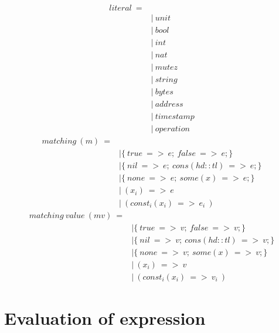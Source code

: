 \documentclass[10pt,a4paper]{article}
\begin{document}
\begin{align*}
literal\ =
\\
 \ &|\ unit     \tag{}
\\
 \ &|\ bool     \tag{}
\\
 \ &|\ int     \tag{}
\\
 \ &|\ nat     \tag{}
\\
 \ &|\ mutez     \tag{}
\\
 \ &|\ string     \tag{}
\\
 \ &|\ bytes     \tag{}
\\
 \ &|\ address     \tag{}
\\
 \ &|\ timestamp     \tag{}
\\
 \ &|\ operation     \tag{}
\end{align*}
\begin{align*}
matching\ (m)\ = 
\\
 \ &| \{\ true\ =>\ e;\ false\ =>\ e;\}        \tag{match\ bool}
\\
 \ &| \{\ nil \ =>\ e;\ cons(hd::tl)\ =>\ e;\} \tag{match\ list}
\\
 \ &| \{\ none\ =>\ e;\ some(x) \ =>\ e;\}     \tag{match\ option}
\\
 \ &|\ (x_i) \ =>\ e                      \tag{match\ tuple}
\\
 \ &|\ (const_i(x_i)\ =>\ e_i\ )           \tag{match\ variant}
\end{align*}
\begin{align*}
matching\ value\ (mv)\ = 
\\
 \ &| \{\ true\ =>\ v;\ false\ =>\ v;\}        \tag{match\ bool\ value}
\\
 \ &| \{\ nil \ =>\ v;\ cons(hd::tl)\ =>\ v;\} \tag{match\ list\ value}
\\
 \ &| \{\ none\ =>\ v;\ some(x) \ =>\ v;\}     \tag{match\ option\ value}
\\
 \ &|\ (x_i) \ =>\ v                      \tag{match\ tuple\ value}
\\
 \ &|\ (const_i(x_i)\ =>\ v_i\ )           \tag{match\ variant\ value}
\end{align*}

\section*{ Evaluation of expression }
\end{document}

